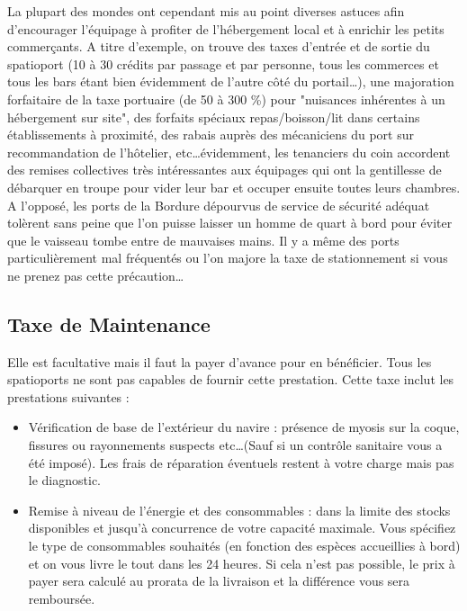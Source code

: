 \documentclass{article}
\begin{document}
La plupart des mondes ont cependant mis au point diverses astuces afin d'encourager l'équipage à profiter de l'hébergement local et à enrichir les petits commerçants. A titre d'exemple, on trouve des taxes d'entrée et de sortie du spatioport (10 à 30 crédits par passage et par personne, tous les commerces et tous les bars étant bien évidemment de l'autre côté du portail\ldots), une majoration forfaitaire de la taxe portuaire (de 50 à 300 \%) pour "nuisances inhérentes à un hébergement sur site", des forfaits spéciaux repas/boisson/lit dans certains établissements à proximité, des rabais auprès des mécaniciens du port sur recommandation de l'hôtelier, etc\ldots évidemment, les tenanciers du coin accordent des remises collectives très intéressantes aux équipages qui ont la gentillesse de débarquer en troupe pour vider leur bar et occuper ensuite toutes leurs chambres.\\

A l'opposé, les ports de la Bordure dépourvus de service de sécurité adéquat tolèrent sans peine que l'on puisse laisser un homme de quart à bord pour éviter que le vaisseau tombe entre de mauvaises mains. Il y a même des ports particulièrement mal fréquentés ou l'on majore la taxe de stationnement si vous ne prenez pas cette précaution\ldots

\subsection*{Taxe de Maintenance}
Elle est facultative mais il faut la payer d'avance pour en bénéficier. Tous les spatioports ne sont pas capables de fournir cette prestation. Cette taxe inclut les prestations suivantes : 

\begin{itemize}
	\item Vérification de base de l'extérieur du navire : présence de myosis sur la coque, fissures ou rayonnements suspects etc\ldots (Sauf si un contrôle sanitaire vous a été imposé). Les frais de réparation éventuels restent à votre charge mais pas le diagnostic.
	\item Remise à niveau de l'énergie et des consommables : dans la limite des stocks disponibles et jusqu'à concurrence de votre capacité maximale. Vous spécifiez le type de consommables souhaités (en fonction des espèces accueillies à bord) et on vous livre le tout dans les 24 heures. Si cela n'est pas possible, le prix à payer sera calculé au prorata de la livraison et la différence vous sera remboursée.
\end{itemize}
\end{document}
